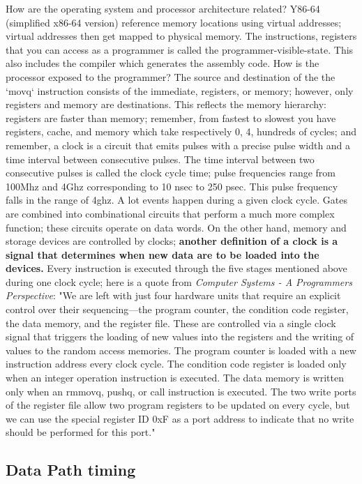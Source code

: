 \documentclass{amsbook}
\begin{document}
How are the operating system and processor architecture related? Y86-64 (simplified x86-64 version) reference memory locations using virtual addresses; virtual addresses then get mapped to physical memory. The instructions, registers that you can access as a programmer is called the programmer-visible-state. This also includes the compiler which generates the assembly code. How is the processor exposed to the programmer? The source and destination of the the `movq` instruction consists of the immediate, registers, or memory; however, only registers and memory are destinations. This reflects the memory hierarchy: registers are faster than memory; remember, from fastest to slowest you have registers, cache, and memory which take respectively 0, 4, hundreds of cycles; and remember, a clock is a circuit that emits pulses with a precise pulse width and a time interval between consecutive pulses. The time interval between two consecutive pulses is called the clock cycle time; pulse frequencies range from 100Mhz and 4Ghz corresponding to 10 nsec to 250 psec. This pulse frequency falls in the range of 4ghz. A lot events happen during a given clock cycle. Gates are combined into combinational circuits that perform a much more complex function; these circuits operate on data words. On the other hand, memory and storage devices are controlled by clocks; \textbf{another definition of a clock is a signal that determines when new data are to be loaded into the devices.} Every instruction is executed through the five stages mentioned above during one clock cycle; here is a quote from \textit{Computer Systems - A Programmers Perspective}: "We are left with just four hardware units that require an explicit control over their sequencing—the program counter, the condition code register, the data memory, and the register file. These are controlled via a single clock signal that triggers the loading of new values into the registers and the writing of values to the random access memories. The program counter is loaded with a new instruction address every clock cycle. The condition code register is loaded only when an integer operation instruction is executed. The data memory is written only when an rmmovq, pushq, or call instruction is executed. The two write ports of the register file allow two program registers to be updated on every cycle, but we can use the special register ID 0xF as a port address to indicate that no write should be performed for this port."

\subsection{Data Path timing}
\end{document}
